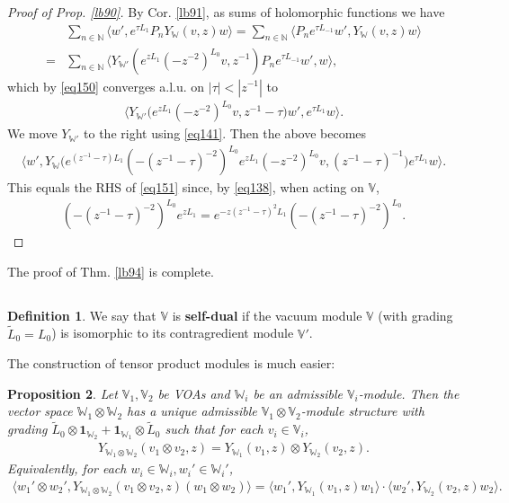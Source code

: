 \documentclass[12pt,a4paper,notitlepage]{article}
\theoremstyle{definition}
\newtheorem{df}{Definition}[section]
\theoremstyle{plain}
\newtheorem{pp}[df]{Proposition}
\newcommand{\wtd}{\widetilde}
\newcommand{\id}{\mathbf{1}}
\newcommand{\bk}[1]{\langle {#1}\rangle}
\newcommand{\bigbk}[1]{\big\langle {#1}\big\rangle}
\newcommand{\Vbb}{\mathbb V}
\newcommand{\Wbb}{\mathbb W}
\newcommand{\Nbb}{\mathbb N}
\numberwithin{equation}{section}
\begin{document}
\begin{proof}[Proof of Prop. \ref{lb90}]
By Cor. \ref{lb91}, as sums of holomorphic functions we have
\begin{align*}
&\sum_{n\in\Nbb}\bigbk{w',e^{\tau L_1}P_nY_\Wbb(v,z)w}=\sum_{n\in\Nbb}\bigbk{P_ne^{\tau L_{-1}}w',Y_\Wbb(v,z)w}\\
=&\sum_{n\in\Nbb}\bigbk{Y_{\Wbb'}(e^{zL_1}(-z^{-2})^{L_0}v,z^{-1})P_ne^{\tau L_{-1}}w',w},
\end{align*}
which by \eqref{eq150} converges a.l.u. on $|\tau|<|z^{-1}|$ to
\begin{align*}
\bigbk{Y_{\Wbb'}\big(e^{zL_1}(-z^{-2})^{L_0}v,z^{-1}-\tau\big)w',e^{\tau L_1}w}.
\end{align*}
We move $Y_{\Wbb'}$ to the right using \eqref{eq141}. Then the above becomes
\begin{align*}
\bigbk{w',Y_\Wbb\big(e^{(z^{-1}-\tau)L_1}(-(z^{-1}-\tau)^{-2})^{L_0}e^{zL_1}(-z^{-2})^{L_0}v,(z^{-1}-\tau)^{-1}\big)e^{\tau L_1}w}.
\end{align*}
This equals the RHS of \eqref{eq151} since, by \eqref{eq138}, when acting on $\Vbb$,
\begin{align*}
(-(z^{-1}-\tau)^{-2})^{L_0}e^{zL_1}=e^{-z(z^{-1}-\tau)^2L_1}	(-(z^{-1}-\tau)^{-2})^{L_0}.
\end{align*}
\end{proof}

The proof of Thm. \ref{lb94} is complete.

\subsection{}






\begin{df}
	We say that $\Vbb$ is \textbf{self-dual}  if the vacuum module $\Vbb$ (with grading $\wtd L_0=L_0$) is isomorphic to its contragredient module $\Vbb'$.
\end{df}


The construction of tensor product modules is much easier:

\begin{pp}
Let $\Vbb_1,\Vbb_2$ be VOAs and $\Wbb_i$ be an admissible $\Vbb_i$-module. Then the vector space $\Wbb_1\otimes\Wbb_2$ has a unique admissible $\Vbb_1\otimes\Vbb_2$-module structure with grading $\wtd L_0\otimes\id_{\Wbb_2}+\id_{\Wbb_1}\otimes \wtd L_0$ such that for each $v_i\in\Vbb_i$,
\begin{align}
Y_{\Wbb_1\otimes\Wbb_2}(v_1\otimes v_2,z)=Y_{\Wbb_1}(v_1,z)\otimes Y_{\Wbb_2}(v_2,z).	
\end{align}
Equivalently, for each $w_i\in \Wbb_i,w_i'\in\Wbb_i'$,
\begin{align}
\bigbk{w_1'\otimes w_2',Y_{\Wbb_1\otimes\Wbb_2}(v_1\otimes v_2,z)(w_1\otimes w_2)}=\bk{w_1',Y_{\Wbb_1}(v_1,z)w_1}\cdot \bk{w_2',Y_{\Wbb_2}(v_2,z)w_2}.	\label{eq152}
\end{align}
\end{pp}
\end{document}
